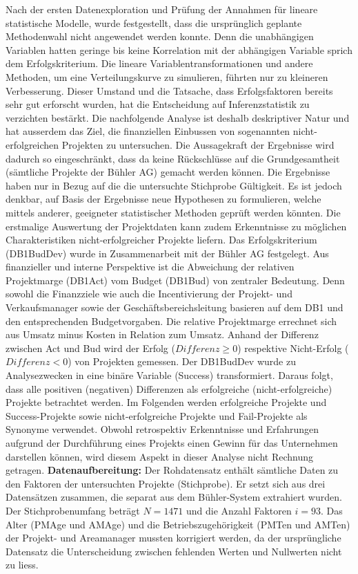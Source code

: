 Nach der ersten Datenexploration und Prüfung der Annahmen für lineare statistische Modelle, wurde festgestellt, dass die ursprünglich geplante Methodenwahl nicht angewendet werden konnte. Denn die unabhängigen Variablen hatten geringe bis keine Korrelation mit der abhängigen Variable sprich dem Erfolgskriterium. Die lineare Variablentransformationen und andere Methoden, um eine Verteilungskurve zu simulieren, führten nur zu kleineren Verbesserung. Dieser Umstand und die Tatsache, dass Erfolgsfaktoren bereits sehr gut erforscht wurden, hat die Entscheidung auf Inferenzstatistik zu verzichten bestärkt. Die nachfolgende Analyse ist deshalb deskriptiver Natur und hat ausserdem das Ziel, die finanziellen Einbussen von sogenannten nicht-erfolgreichen Projekten zu untersuchen. Die Aussagekraft der Ergebnisse wird dadurch so eingeschränkt, dass da keine Rückschlüsse auf die Grundgesamtheit (sämtliche Projekte der Bühler AG) gemacht werden können.  Die Ergebnisse haben nur in Bezug auf die die untersuchte Stichprobe Gültigkeit. Es ist jedoch denkbar, auf Basis der Ergebnisse neue Hypothesen zu formulieren, welche mittels anderer, geeigneter statistischer Methoden geprüft werden könnten. Die erstmalige Auswertung der Projektdaten kann zudem Erkenntnisse zu möglichen Charakteristiken nicht-erfolgreicher Projekte liefern.
\newline Das Erfolgskriterium (DB1BudDev) wurde in Zusammenarbeit mit der Bühler AG festgelegt. Aus finanzieller und interne Perspektive ist die Abweichung der relativen Projektmarge (DB1Act) vom Budget (DB1Bud) von zentraler Bedeutung. Denn sowohl die Finanzziele wie auch die Incentivierung der Projekt- und Verkaufsmanager sowie der Geschäftsbereichsleitung basieren auf dem DB1 und den entsprechenden Budgetvorgaben. Die relative Projektmarge errechnet sich aus Umsatz minus Kosten in Relation zum Umsatz. Anhand der Differenz zwischen Act und Bud wird der Erfolg ($Differenz \geq 0$) respektive Nicht-Erfolg ($Differenz < 0$) von Projekten gemessen. Der DB1BudDev wurde zu Analysezwecken in eine binäre Variable (Success) transformiert. Daraus folgt, dass alle positiven (negativen) Differenzen als erfolgreiche (nicht-erfolgreiche) Projekte betrachtet werden. Im Folgenden werden erfolgreiche Projekte und Success-Projekte sowie nicht-erfolgreiche Projekte und Fail-Projekte als Synonyme verwendet. Obwohl retrospektiv Erkenntnisse und Erfahrungen aufgrund der Durchführung eines Projekts einen Gewinn für das Unternehmen darstellen können, wird diesem Aspekt in dieser Analyse nicht Rechnung getragen.
\newline\newline\textbf{Datenaufbereitung:} Der Rohdatensatz enthält sämtliche Daten zu den Faktoren der untersuchten Projekte (Stichprobe). Er setzt sich aus drei Datensätzen zusammen, die separat aus dem Bühler-System extrahiert wurden. Der Stichprobenumfang beträgt $N = 1471$ und die Anzahl Faktoren $i = 93$. Das Alter (PMAge und AMAge) und die Betriebszugehörigkeit (PMTen und AMTen) der Projekt- und Areamanager mussten korrigiert werden, da der ursprüngliche Datensatz die Unterscheidung zwischen fehlenden Werten und Nullwerten nicht zu liess.
